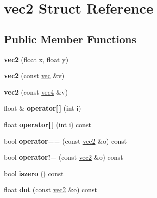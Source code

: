 \hypertarget{structvec2}{}\section{vec2 Struct Reference}
\label{structvec2}
\subsection*{Public Member Functions}
\begin{DoxyCompactItemize}
\item 
\mbox{\label{structvec2_a9486933da4d4d819a8b99bae91066cb3}} 
{\bfseries vec2} (float x, float y)
\item 
\mbox{\label{structvec2_ae1b4811df35b16632d71ec5db36be9b3}} 
{\bfseries vec2} (const \hyperlink{structvec}{vec} \&v)
\item 
\mbox{\label{structvec2_ac5063c607aa6bb10a4e12ea4e3edf0bb}} 
{\bfseries vec2} (const \hyperlink{structvec4}{vec4} \&v)
\item 
\mbox{\label{structvec2_a1d956a1fd2c0fb417efbac421fdfa821}} 
float \& {\bfseries operator\mbox{[}$\,$\mbox{]}} (int i)
\item 
\mbox{\label{structvec2_a52b83b1724d52003507cb5ef72b1f215}} 
float {\bfseries operator\mbox{[}$\,$\mbox{]}} (int i) const
\item 
\mbox{\label{structvec2_ab21170f27ac3919faae19d6911f7b81e}} 
bool {\bfseries operator==} (const \hyperlink{structvec2}{vec2} \&o) const
\item 
\mbox{\label{structvec2_a470ca8883bfc9699b9db31e92b1ce094}} 
bool {\bfseries operator!=} (const \hyperlink{structvec2}{vec2} \&o) const
\item 
\mbox{\label{structvec2_a7d34fac6bb6d5db5a8677ace4323b463}} 
bool {\bfseries iszero} () const
\item 
\mbox{\label{structvec2_a7692582d6380882396f073980acb2c13}} 
float {\bfseries dot} (const \hyperlink{structvec2}{vec2} \&o) const
\item 
\mbox{\label{structvec2_abd417714a16dd7ae775c07915bd53eba}} 

\end{DoxyCompactItemize}
